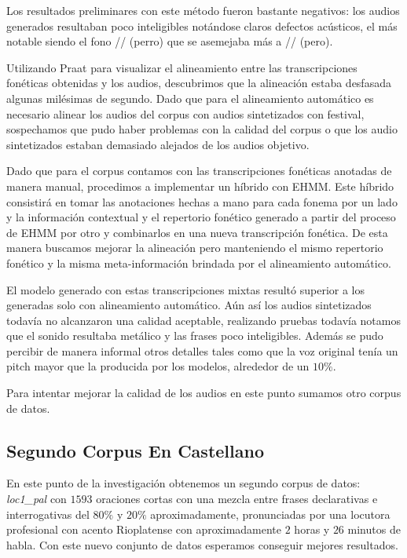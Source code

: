 Los resultados preliminares con este método fueron bastante negativos: los audios generados resultaban poco inteligibles notándose claros defectos acústicos, el más notable siendo el fono // (perro) que se asemejaba más a // (pero).

Utilizando Praat para visualizar el alineamiento entre las transcripciones fonéticas obtenidas y los audios, descubrimos que la alineación estaba desfasada algunas milésimas de segundo. Dado que para el alineamiento automático es necesario alinear los audios del corpus con audios sintetizados con festival, sospechamos que pudo haber problemas con la calidad del corpus o que los audio sintetizados estaban demasiado alejados de los audios objetivo.

Dado que para el corpus contamos con las transcripciones fonéticas anotadas de manera manual, procedimos a implementar un híbrido con EHMM. Este híbrido  consistirá en tomar las anotaciones hechas a mano para cada fonema por un lado y la información contextual y el repertorio fonético generado a partir del proceso de EHMM por otro y combinarlos en una nueva transcripción fonética. De esta manera buscamos mejorar la alineación pero manteniendo el mismo repertorio fonético y la misma meta-información brindada por el alineamiento automático.

El modelo generado con estas transcripciones mixtas resultó superior a los generadas solo con alineamiento automático. Aún así los audios sintetizados todavía no alcanzaron una calidad aceptable, realizando pruebas todavía notamos que el sonido resultaba metálico y las frases poco inteligibles. Además se pudo percibir de manera informal otros detalles tales como que la voz original tenía un pitch mayor que la producida por los modelos, alrededor de un $10\%$.

Para intentar mejorar la calidad de los audios en este punto sumamos otro corpus de datos.

\subsection{Segundo Corpus En Castellano}

En este punto de la investigación obtenemos un segundo corpus de datos: \textit{loc1\_pal} \cite{loc1pal} con $1593$ oraciones cortas con una mezcla entre frases declarativas e interrogativas del $80\%$ y $20\%$ aproximadamente, pronunciadas por una locutora profesional con acento Rioplatense con aproximadamente $2$ horas y $26$ minutos de habla. Con este nuevo conjunto de datos esperamos conseguir mejores resultados.

